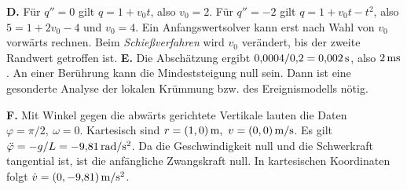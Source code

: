 \textbf{D.} Für \(q''=0\) gilt \(q=1+v_0t\), also \(v_0=2\). Für \(q''=-2\) gilt \(q=1+v_0t-t^2\), also \(5=1+2v_0-4\) und \(v_0=4\). Ein Anfangswertsolver kann erst nach Wahl von \(v_0\) vorwärts rechnen. Beim \emph{Schießverfahren} wird \(v_0\) verändert, bis der zweite Randwert getroffen ist.
\hypertarget{extraEF}{}
\textbf{E.} Die Abschätzung ergibt \(0{,}0004/0{,}2=0{,}002\,\mathrm{s}\), also \(2\,\mathrm{ms}\). An einer Berührung kann die Mindeststeigung null sein. Dann ist eine gesonderte Analyse der lokalen Krümmung bzw. des Ereignismodells nötig.

\textbf{F.} Mit Winkel gegen die abwärts gerichtete Vertikale lauten die Daten \(\varphi=\pi/2,\ \omega=0\). Kartesisch sind \(r=(1,0)\unitm m,\ v=(0,0)\unitm{m/s}\). Es gilt \(\ddot\varphi=-g/L=-9{,}81\,\mathrm{rad/s^2}\). Da die Geschwindigkeit null und die Schwerkraft tangential ist, ist die anfängliche Zwangskraft null. In kartesischen Koordinaten folgt \(\dot v=(0,-9{,}81)\,\mathrm{m/s^2}\).

